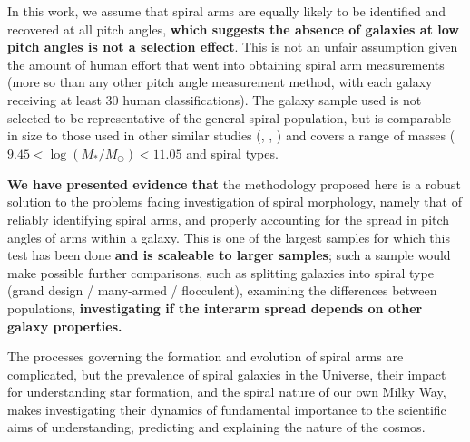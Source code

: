 In this work, we assume that spiral arms are equally likely to be identified and recovered at all pitch angles, \textbf{which suggests the absence of galaxies at low pitch angles is not a selection effect}. This is not an unfair assumption given the amount of human effort that went into obtaining spiral arm measurements (more so than any other pitch angle measurement method, with each galaxy receiving at least 30 human classifications). The galaxy sample used is not selected to be representative of the general spiral population, but is comparable in size to those used in other similar studies (\citealt{2013MNRAS.436.1074S}, \citealt{2019ApJ...871..194Y}, \citealt{2019arXiv190910291P}) and covers a range of masses ($9.45 < \log(M_* / M_\odot) < 11.05$ and spiral types.

\textbf{We have presented evidence that} the methodology proposed here is a robust solution to the problems facing investigation of spiral morphology, namely that of reliably identifying spiral arms, and properly accounting for the spread in pitch angles of arms within a galaxy. This is one of the largest samples for which this test has been done \textbf{and is scaleable to larger samples}; such a sample would make possible further comparisons, such as splitting galaxies into spiral type (grand design / many-armed / flocculent), examining the differences between populations, \textbf{investigating if the interarm spread depends on other galaxy properties.}

The processes governing the formation and evolution of spiral arms are complicated, but the prevalence of spiral galaxies in the Universe, their impact for understanding star formation, and the spiral nature of our own Milky Way, makes investigating their dynamics of fundamental importance to the scientific aims of understanding, predicting and explaining the nature of the cosmos. 
